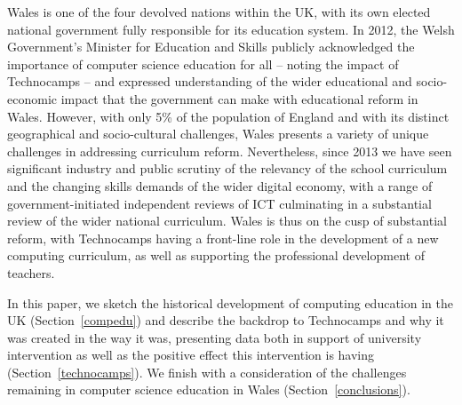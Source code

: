 \documentclass{sig-alternate}
\begin{document}
Wales is one of the four devolved nations within the UK, with its own
elected national government fully responsible for its education
system.  In 2012, the Welsh Government's Minister for Education and
Skills publicly acknowledged the importance of computer science
education for all -- noting the impact of Technocamps -- and expressed
understanding of the wider educational and socio-economic impact that
the government can make with educational reform in Wales.  However,
with only 5\% of the population of England and with its distinct
geographical and socio-cultural challenges, Wales presents a variety
of unique challenges in addressing curriculum reform. Nevertheless,
since 2013 we have seen significant industry and public scrutiny of
the relevancy of the school curriculum and the changing skills demands
of the wider digital economy, with a range of government-initiated
independent reviews of ICT culminating in a substantial review of the
wider national curriculum. Wales is thus on the cusp of substantial
reform, with Technocamps having a front-line role in the
development of a new computing curriculum, as well as supporting the
professional development of teachers.

In this paper, we 
sketch the historical development of computing education in the UK
(Section~\ref{compedu}) and describe the backdrop to Technocamps and why
it was created in the way it was, presenting data both in support of
university intervention as well as the positive effect this
intervention is having (Section~\ref{technocamps}).
We finish with a consideration of the challenges
remaining in computer science education in Wales
(Section~\ref{conclusions}).
\end{document}
